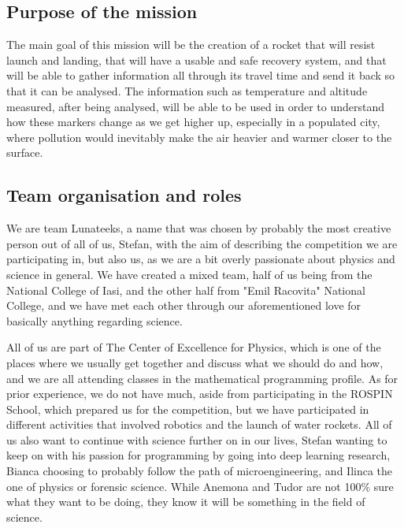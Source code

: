 \subsection{Purpose of the mission}

The main goal of this mission will be the creation of a rocket that will resist launch and landing, that will have a usable and safe recovery system, and that will be able to gather information all through its travel time and send it back so that it can be analysed. The information such as temperature and altitude measured, after being analysed, will be able to be used in order to understand how these markers change as we get higher up, especially in a populated city, where pollution would inevitably make the air heavier and warmer closer to the surface. 

\subsection{Team organisation and roles}

We are team Lunateeks, a name that was chosen by probably the most creative person out of all of us, Stefan, with the aim of describing the competition we are participating in, but also us, as we are a bit overly passionate about physics and science in general. We have created a mixed team, half of us being from the National College of Iasi, and the other half from "Emil Racovita" National College, and we have met each other through our aforementioned love for basically anything regarding science.

All of us are part of The Center of Excellence for Physics, which is one of the places where we usually get together and discuss what we should do and how, and we are all attending classes in the mathematical programming profile. As for prior experience, we do not have much, aside from participating in the ROSPIN School, which prepared us for the competition, but we have participated in different activities that involved robotics and the launch of water rockets. All of us also want to continue with science further on in our lives, Stefan wanting to keep on with his passion for programming by going into deep learning research, Bianca choosing to probably follow the path of microengineering, and Ilinca the one of physics or forensic science. While Anemona and Tudor are not 100\% sure what they want to be doing, they know it will be something in the field of science. 


